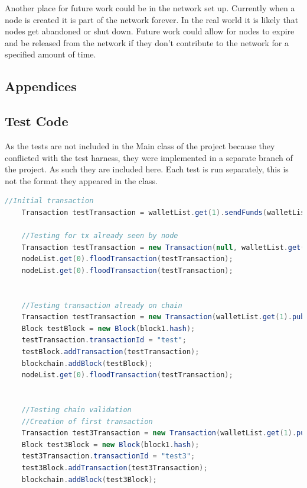 \documentclass{l4proj}
\begin{document}
Another place for future work could be in the network set up. Currently when a node is created it is part of the
network forever. In the real world it is likely that nodes get abandoned or shut down. Future work could allow for 
nodes to expire and be released from the network if they don't contribute to the network for a specified amount of time.


\begin{appendices}

\chapter{Appendices}

\section{Test Code}
As the tests are not included in the Main class of the project because they conflicted with the test harness, they were implemented
in a separate branch of the project. As such they are included here. Each test is run separately, this is not the format they appeared
in the class.

\begin{lstlisting}[language=java, float=h
    , label=lst:testCode]
    //Initial transaction
    Transaction testTransaction = walletList.get(1).sendFunds(walletList.get(2).publicKey, 10);

    //Testing for tx already seen by node
    Transaction testTransaction = new Transaction(null, walletList.get(2).publicKey,10, null, blockchain);
    nodeList.get(0).floodTransaction(testTransaction);
    nodeList.get(0).floodTransaction(testTransaction);


    //Testing transaction already on chain
    Transaction testTransaction = new Transaction(walletList.get(1).publicKey, walletList.get(2).publicKey, 10, null, blockchain);
    Block testBlock = new Block(block1.hash);
    testTransaction.transactionId = "test";
    testBlock.addTransaction(testTransaction);
    blockchain.addBlock(testBlock);
    nodeList.get(0).floodTransaction(testTransaction);


    //Testing chain validation
    //Creation of first transaction
    Transaction test3Transaction = new Transaction(walletList.get(1).publicKey, walletList.get(2).publicKey, 10, null, blockchain);
    Block test3Block = new Block(block1.hash);
    test3Transaction.transactionId = "test3";
    test3Block.addTransaction(test3Transaction);
    blockchain.addBlock(test3Block);


\end{lstlisting}
\end{appendices}
\end{document}
